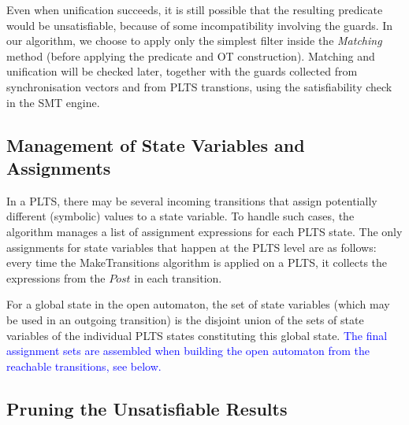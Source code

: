 \documentclass[smallcondensed]{svjour3}
\newcommand{\ERIC}[1]{\textcolor{blue}{#1}}
\newcommand{\QIN}[1]{\textcolor{airforceblue}{#1}}
\begin{document}
Even when unification succeeds, it is still possible that
the resulting predicate would be unsatisfiable, because of some
incompatibility involving the guards. In our algorithm, we choose to
apply only the simplest filter inside the \emph{Matching} method
(before applying the predicate and OT construction). Matching and
unification  will be checked later, together with the guards collected
from synchronisation vectors and from PLTS transtions, using the
satisfiability check in the SMT engine.


\subsection{Management of State Variables and Assignments}


In a PLTS, there may be several incoming transitions 
that assign potentially different (symbolic) values to a state variable.
To handle such cases, the algorithm manages a
list of assignment expressions for each PLTS state. 
The only assignments for state variables that happen at the PLTS level
are as follows: every time the MakeTransitions 
algorithm is applied on a PLTS, it collects the expressions from the
$Post$ in each transition. 

For a global state in the open automaton, the set of state
variables (which may be used in an outgoing transition) 
is the disjoint union
of the sets of state variables of the individual PLTS states constituting this
global state. \ERIC{The final assignment sets are assembled when building the
open automaton from the reachable transitions, see below.}



\subsection{Pruning the Unsatisfiable Results}
\label{section:pruning}
\end{document}
